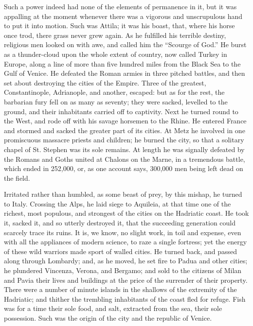 Such a power indeed had none
of the elements of permanence in it, but it was appalling at the
moment whenever there was a vigorous and unscrupulous hand to put it
into motion. Such was Attila; it was his boast, that, where his horse
once trod, there grass never grew again. As he fulfilled his terrible
destiny, religious men looked on with awe, and called him the ``Scourge
of God.'' He burst as a thunder-cloud upon the whole extent of country,
now called Turkey in Europe, along a line of more than five hundred
miles from the Black Sea to the Gulf of Venice. He defeated the Roman
armies in three pitched battles, and then set about destroying the
cities of the Empire. Three of the greatest, Constantinople,
Adrianople, and another, escaped: but as for the rest, the barbarian
fury fell on as many as seventy; they were sacked, levelled to the
ground, and their inhabitants carried off to captivity. Next he turned
round to the West, and rode off with his savage horsemen to the
Rhine. He entered France and stormed and sacked the greater part of
its cities. At Metz he involved in one promiscuous massacre priests
and children; he burned the city, so that a solitary chapel of St.
Stephen was its sole remains. At length he was signally defeated by
the Romans and Goths united at Chalons on the Marne, in a tremendous
battle, which ended in 252,000, or, as one account says, 300,000 men
being left dead on the field.

Irritated rather than humbled,
as some beast of prey, by this mishap, he turned to Italy. Crossing
the Alps, he laid siege to Aquileia, at that time one of the richest,
most populous, and strongest of the cities on the Hadriatic coast. He
took it, sacked it, and so utterly destroyed it, that the succeeding
generation could scarcely trace its ruins. It is, we know, no slight
work, in toil and expense, even with all the appliances of modern
science, to raze a single fortress; yet the energy of these wild
warriors made sport of walled cities. He turned back, and passed along
through Lombardy; and, as he moved, he set fire to Padua and other
cities; he plundered Vincenza, Verona, and Bergamo; and sold to the
citizens of Milan and Pavia their lives and buildings at the price of
the surrender of their property. There were a number of minute islands
in the shallows of the extremity of the Hadriatic; and thither the
trembling inhabitants of the coast fled for refuge. Fish was for a
time their sole food, and salt, extracted from the sea, their sole
possession. Such was the origin of the city and the republic of
Venice.

